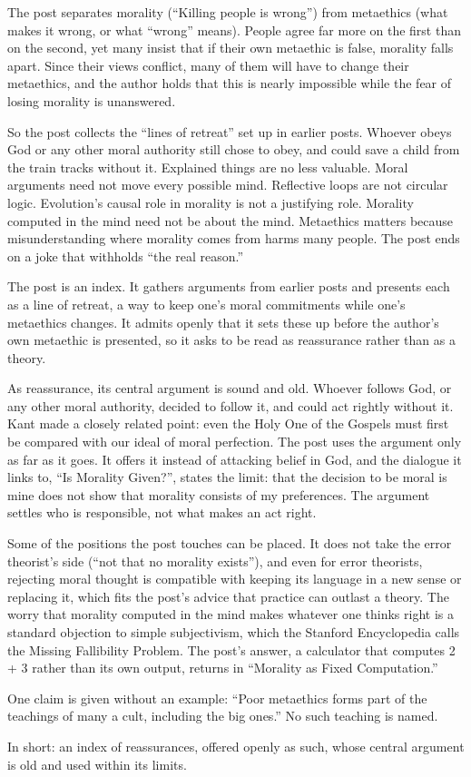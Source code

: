 \begin{afterword}
\summaryhead

The post separates morality (``Killing people is wrong'') from metaethics (what makes it wrong, or what ``wrong'' means). People agree far more on the first than on the second, yet many insist that if their own metaethic is false, morality falls apart. Since their views conflict, many of them will have to change their metaethics, and the author holds that this is nearly impossible while the fear of losing morality is unanswered.

So the post collects the ``lines of retreat'' set up in earlier posts. Whoever obeys God or any other moral authority still chose to obey, and could save a child from the train tracks without it. Explained things are no less valuable. Moral arguments need not move every possible mind. Reflective loops are not circular logic. Evolution's causal role in morality is not a justifying role. Morality computed in the mind need not be about the mind. Metaethics matters because misunderstanding where morality comes from harms many people. The post ends on a joke that withholds ``the real reason.''

\responsehead

The post is an index. It gathers arguments from earlier posts and presents each as a line of retreat, a way to keep one's moral commitments while one's metaethics changes. It admits openly that it sets these up before the author's own metaethic is presented, so it asks to be read as reassurance rather than as a theory.

As reassurance, its central argument is sound and old. Whoever follows God, or any other moral authority, decided to follow it, and could act rightly without it. Kant made a closely related point: even the Holy One of the Gospels must first be compared with our ideal of moral perfection. The post uses the argument only as far as it goes. It offers it instead of attacking belief in God, and the dialogue it links to, ``Is Morality Given?'', states the limit: that the decision to be moral is mine does not show that morality consists of my preferences. The argument settles who is responsible, not what makes an act right.

Some of the positions the post touches can be placed. It does not take the error theorist's side (``not that no morality exists''), and even for error theorists, rejecting moral thought is compatible with keeping its language in a new sense or replacing it, which fits the post's advice that practice can outlast a theory. The worry that morality computed in the mind makes whatever one thinks right is a standard objection to simple subjectivism, which the Stanford Encyclopedia calls the Missing Fallibility Problem. The post's answer, a calculator that computes 2 + 3 rather than its own output, returns in ``Morality as Fixed Computation.''

One claim is given without an example: ``Poor metaethics forms part of the teachings of many a cult, including the big ones.'' No such teaching is named.

In short: an index of reassurances, offered openly as such, whose central argument is old and used within its limits.
\end{afterword}
